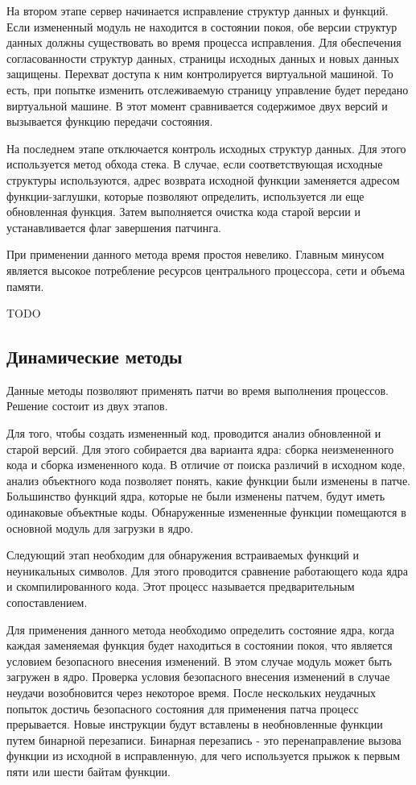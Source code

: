 На втором этапе сервер начинается исправление структур данных и функций. Если измененный модуль не находится в состоянии покоя, обе версии структур данных должны существовать во время процесса исправления. Для обеспечения согласованности структур данных, страницы исходных данных и новых данных защищены. Перехват доступа к ним контролируется виртуальной машиной. То есть, при попытке изменить отслеживаемую страницу управление будет передано виртуальной машине. В этот момент сравнивается содержимое двух версий и вызывается функцию передачи состояния.

На последнем этапе отключается контроль исходных структур данных. Для этого используется метод обхода стека. В случае, если соответствующая исходные структуры используются, адрес возврата исходной функции заменяется адресом функции-заглушки, которые позволяют определить, используется ли еще обновленная функция. Затем выполняется очистка кода старой версии и устанавливается флаг завершения патчинга.

При применении данного метода время простоя невелико. Главным минусом является высокое потребление ресурсов центрального процессора, сети и объема памяти.

TODO

\subsection{Динамические методы}

Данные методы \cite{dynamic} позволяют применять патчи во время выполнения процессов. Решение состоит из двух этапов.

Для того, чтобы создать измененный код, проводится анализ обновленной и старой	версий. Для этого собирается два варианта ядра: сборка неизмененного кода и сборка измененного кода. В отличие от поиска различий в исходном коде, анализ объектного кода позволяет понять, какие функции были изменены в патче. Большинство функций ядра, которые не были изменены патчем, будут иметь одинаковые объектные коды. Обнаруженные измененные функции помещаются в основной модуль для загрузки в ядро.

Следующий этап необходим для обнаружения встраиваемых функций и неуникальных символов. Для этого проводится сравнение работающего кода ядра и скомпилированного кода. Этот процесс называется предварительным сопоставлением.

Для применения данного метода необходимо определить состояние ядра, когда каждая заменяемая функция будет находиться в состоянии покоя, что является условием безопасного внесения изменений. В этом случае модуль может быть загружен в ядро. Проверка условия безопасного внесения изменений в случае неудачи возобновится через некоторое время. После нескольких неудачных попыток достичь безопасного состояния для применения патча процесс прерывается. Новые инструкции будут вставлены в необновленные функции путем бинарной перезаписи. Бинарная перезапись - это перенаправление вызова функции из исходной в исправленную, для чего используется прыжок к первым пяти или шести байтам функции.

